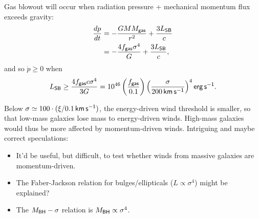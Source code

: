 \documentclass{tufte-handout}
\renewcommand{\rm}{\sf}
\begin{document}
Gas blowout will occur when radiation pressure + mechanical momentum flux exceeds gravity:
\begin{align*}
\frac{dp}{dt} &= - \frac{GM M_{\rm gas}}{r^2} + \frac{3L_{\rm SB}}{c}\\
&= -\frac{4f_{\rm gas} \sigma^4}{G} + \frac{3L_{\rm SB}}{c},
\end{align*}
and so $\dot p \geq 0$ when 
\begin{equation}
L_{\rm SB}\geq \frac{4f_{\rm gas} c \sigma^4}{3 G} = 10^{46} \left (\frac{f_{\rm gas}}{0.1}\right )\left (\frac{\sigma}{200\,\rm km\, s^{-1}}\right )^{4} \rm erg\, s^{-1}.
\end{equation}

Below $\sigma \simeq 100\cdot (\xi/0.1\, \rm km\, s^{-1} )$, the energy-driven wind threshold is smaller, so that low-mass galaxies lose mass to energy-driven winds. High-mass galaxies would thus be more affected by momentum-driven winds. Intriguing and maybe correct speculations:
\begin{itemize}
\item It'd be useful, but difficult, to test whether winds from massive galaxies are momentum-driven.
\item The Faber-Jackson relation for bulges/ellipticals ($L\propto \sigma^4$) might be explained?
\item The $M_{\rm BH} - \sigma$ relation is $M_{\rm BH}\propto \sigma^4$.
\end{itemize}
\end{document}
